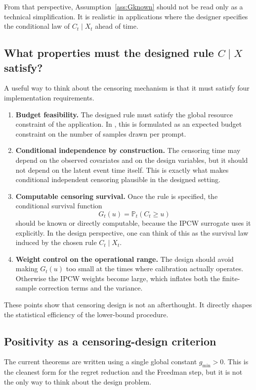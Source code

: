 \documentclass[11pt]{article}
\newcommand{\Prob}{\mathbb{P}}
\newcommand{\1}{\mathbf{1}}
\begin{document}
From that perspective, Assumption~\ref{ass:Gknown} should not be read only as a technical simplification. It is realistic in applications where the designer specifies the conditional law of $C_t\mid X_t$ ahead of time.

\subsection{What properties must the designed rule $C\mid X$ satisfy?}

A useful way to think about the censoring mechanism is that it must satisfy four implementation requirements.
\begin{enumerate}[leftmargin=*,itemsep=2pt]
  \item \textbf{Budget feasibility.} The designed rule must satisfy the global resource constraint of the application. In \citet{Davidov2025}, this is formulated as an expected budget constraint on the number of samples drawn per prompt.
  \item \textbf{Conditional independence by construction.} The censoring time may depend on the observed covariates and on the design variables, but it should not depend on the latent event time itself. This is exactly what makes conditional independent censoring plausible in the designed setting.
  \item \textbf{Computable censoring survival.} Once the rule is specified, the conditional survival function
  \[
  G_t(u)=\Prob_t(C_t\ge u)
  \]
  should be known or directly computable, because the IPCW surrogate uses it explicitly. In the design perspective, one can think of this as the survival law induced by the chosen rule \(C_t\mid X_t\).
  \item \textbf{Weight control on the operational range.} The design should avoid making \(G_t(u)\) too small at the times where calibration actually operates. Otherwise the IPCW weights become large, which inflates both the finite-sample correction terms and the variance.
\end{enumerate}

These points show that censoring design is not an afterthought. It directly shapes the statistical efficiency of the lower-bound procedure.

\subsection{Positivity as a censoring-design criterion}

The current theorems are written using a single global constant $g_{\min}>0$. This is the cleanest form for the regret reduction and the Freedman step, but it is not the only way to think about the design problem.
\end{document}
